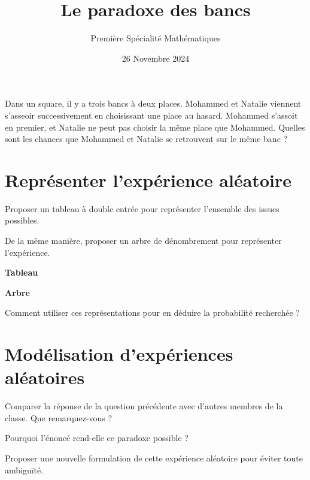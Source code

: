 \documentclass{article}
\title{Le paradoxe des bancs}
\author{Première Spécialité Mathématiques}
\date{26 Novembre 2024}
\begin{document}
\maketitle

\begin{tcolorbox}
Dans un square, il y a trois bancs à deux places. Mohammed et Natalie viennent s'asseoir successivement en choisissant une place au hasard. Mohammed s'assoit en premier, et Natalie ne peut pas choisir la même place que Mohammed. Quelles sont les chances que Mohammed et Natalie se retrouvent sur le même banc ? 
\end{tcolorbox}

\section{Représenter l'expérience aléatoire}
\begin{enumquestions}
\item Proposer un tableau à double entrée pour représenter l'ensemble des issues possibles.
\item De la même manière, proposer un arbre de dénombrement pour représenter l'expérience.

\vspace*{0.5cm}
\begin{minipage}{0.45\textwidth}
\textbf{Tableau}
\vspace*{0.5cm}

\emptybox{10cm}
\end{minipage}
\hfill\vline\hfill
\begin{minipage}{0.45\textwidth}
\textbf{Arbre}
\vspace*{0.5cm}

\emptybox{10cm}
\end{minipage}
\vspace*{0.5cm}
\item Comment utiliser ces représentations pour en déduire la probabilité recherchée ?
\vspace*{0.5cm}

\emptybox{2cm}
\end{enumquestions}

\newpage
\section{Modélisation d'expériences aléatoires}
\begin{enumquestions}
\item Comparer la réponse de la question précédente avec d'autres membres de la classe. Que remarquez-vous ?
\item Pourquoi l'énoncé rend-elle ce paradoxe possible ?
\item Proposer une nouvelle formulation de cette expérience aléatoire pour éviter toute ambiguïté.
\end{enumquestions}
\vspace*{0.5cm}
\end{document}
